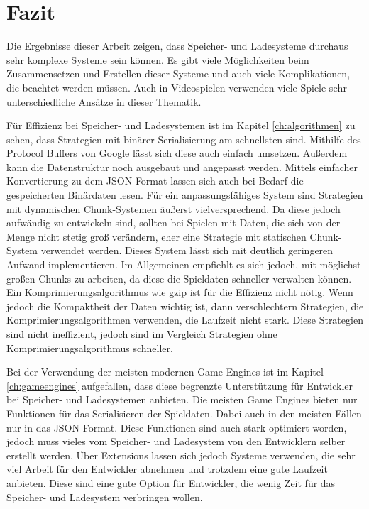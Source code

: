 \chapter{Fazit}\label{ch:fazit}
Die Ergebnisse dieser Arbeit zeigen, dass Speicher- und Ladesysteme durchaus sehr komplexe Systeme sein können. Es gibt viele Möglichkeiten beim Zusammensetzen und Erstellen dieser Systeme und auch viele Komplikationen, die beachtet werden müssen. Auch in Videospielen verwenden viele Spiele sehr unterschiedliche Ansätze in dieser Thematik. 

Für Effizienz bei Speicher- und Ladesystemen ist im Kapitel \ref{ch:algorithmen} zu sehen, dass Strategien mit binärer Serialisierung am schnellsten sind. Mithilfe des Protocol Buffers von Google lässt sich diese auch einfach umsetzen. Außerdem kann die Datenstruktur noch ausgebaut und angepasst werden. Mittels einfacher Konvertierung zu dem JSON-Format lassen sich auch bei Bedarf die gespeicherten Binärdaten lesen. Für ein anpassungsfähiges System sind Strategien mit dynamischen Chunk-Systemen äußerst vielversprechend. Da diese jedoch aufwändig zu entwickeln sind, sollten bei Spielen mit Daten, die sich von der Menge nicht stetig groß verändern, eher eine Strategie mit statischen Chunk-System verwendet werden. Dieses System lässt sich mit deutlich geringeren Aufwand implementieren. Im Allgemeinen empfiehlt es sich jedoch, mit möglichst großen Chunks zu arbeiten, da diese die Spieldaten schneller verwalten können. Ein Komprimierungsalgorithmus wie \ac{gzip} ist für die Effizienz nicht nötig. Wenn jedoch die Kompaktheit der Daten wichtig ist, dann verschlechtern Strategien, die Komprimierungsalgorithmen verwenden, die Laufzeit nicht stark. Diese Strategien sind nicht ineffizient, jedoch sind im Vergleich Strategien ohne Komprimierungsalgorithmus schneller.

Bei der Verwendung der meisten modernen Game Engines ist im Kapitel \ref{ch:gameengines} aufgefallen, dass diese begrenzte Unterstützung für Entwickler bei Speicher- und Ladesystemen anbieten. Die meisten Game Engines bieten nur Funktionen für das Serialisieren der Spieldaten. Dabei auch in den meisten Fällen nur in das JSON-Format. Diese Funktionen sind auch stark optimiert worden, jedoch muss vieles vom Speicher- und Ladesystem von den Entwicklern selber erstellt werden. Über Extensions lassen sich jedoch Systeme verwenden, die sehr viel Arbeit für den Entwickler abnehmen und trotzdem eine gute Laufzeit anbieten. Diese sind eine gute Option für Entwickler, die wenig Zeit für das Speicher- und Ladesystem verbringen wollen.

